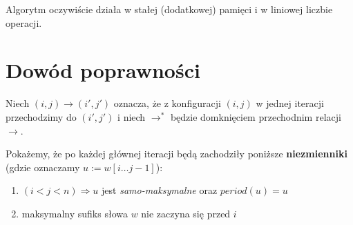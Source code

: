\documentclass{article}
\begin{document}
Algorytm oczywiście działa w stałej (dodatkowej) pamięci i w liniowej liczbie operacji.

\section{Dowód poprawności}

Niech $(i, j) \rightarrow (i', j')$ oznacza, że z konfiguracji $(i, j)$  w jednej iteracji przechodzimy do $(i', j')$ i niech $\rightarrow^{*}$ będzie
domknięciem przechodnim relacji $\rightarrow$. 

Pokażemy, że po każdej głównej iteracji będą zachodziły poniższe \textbf{niezmienniki} (gdzie oznaczamy $u := w[i\ldots j-1]$):
\begin{enumerate}
    \item $(i < j < n) \Rightarrow u$ jest \textit{samo-maksymalne} oraz $period(u) = u$
    \item maksymalny sufiks słowa $w$ nie zaczyna się przed $i$
\end{enumerate}
\end{document}
